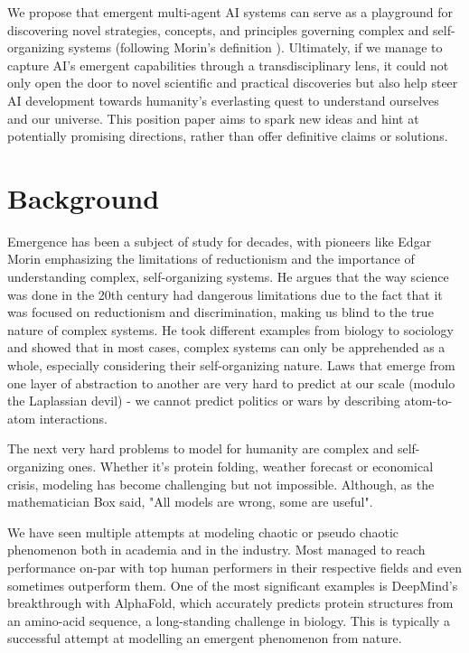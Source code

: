 \documentclass[11pt]{article}
\begin{document}
We propose that emergent multi-agent AI systems can serve as a playground for discovering novel strategies, concepts, and principles governing complex and self-organizing systems (following Morin's definition \cite{morin}). Ultimately, if we manage to capture AI's emergent capabilities through a transdisciplinary lens, it could not only open the door to novel scientific and practical discoveries but also help steer AI development towards humanity's everlasting quest to understand ourselves and our universe.
This position paper aims to spark new ideas and hint at potentially promising directions, rather than offer definitive claims or solutions.

\section{Background}
Emergence has been a subject of study for decades, with pioneers like Edgar Morin emphasizing the limitations of reductionism and the importance of understanding complex, self-organizing systems. He argues that the way science was done in the 20th century had dangerous limitations due to the fact that it was focused on reductionism and discrimination, making us blind to the true nature of complex systems. He took different examples from biology to sociology and showed that in most cases, complex systems can only be apprehended as a whole, especially considering their self-organizing nature. Laws that emerge from one layer of abstraction to another are very hard to predict at our scale (modulo the Laplassian devil) - we cannot predict politics or wars by describing atom-to-atom interactions.

The next very hard problems to model for humanity are complex and self-organizing ones. Whether it's protein folding, weather forecast or economical crisis, modeling has become challenging but not impossible. Although, as the mathematician Box said, "All models are wrong, some are useful".

We have seen multiple attempts at modeling chaotic or pseudo chaotic phenomenon both in academia and in the industry. Most managed to reach performance on-par with top human performers in their respective fields and even sometimes outperform them. One of the most significant examples is DeepMind's breakthrough with AlphaFold, which accurately predicts protein structures from an amino-acid sequence, a long-standing challenge in biology. This is typically a successful attempt at modelling an emergent phenomenon from nature.
\end{document}
